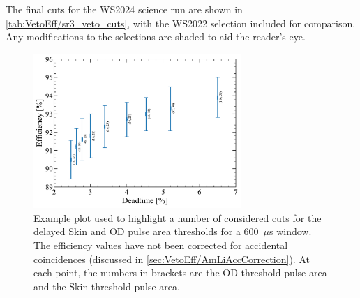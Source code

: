 \noindent
The final cuts for the WS2024 science run are shown in \autoref{tab:VetoEff/sr3_veto_cuts}, with the WS2022 selection included for comparison. Any modifications to the selections are shaded to aid the reader's eye.


\begin{figure}[!ht]
	\centering
	\includegraphics[width=0.7\textwidth]{figures/VetoEfficiency/DeadEffThresholdTest.pdf}
	\caption[Example plot used to highlight a number of considered cuts for the delayed Skin and OD pulse area thresholds for a 600~$\mu$s window.]{Example plot used to highlight a number of considered cuts for the delayed Skin and OD pulse area thresholds for a 600~$\mu$s window. The efficiency values have not been corrected for accidental coincidences (discussed in \autoref{sec:VetoEff/AmLiAccCorrection}). At each point, the numbers in brackets are the OD threshold pulse area and the Skin threshold pulse area.}
	\label{fig:VetoEff/veto_cut_optimisation}
\end{figure}


